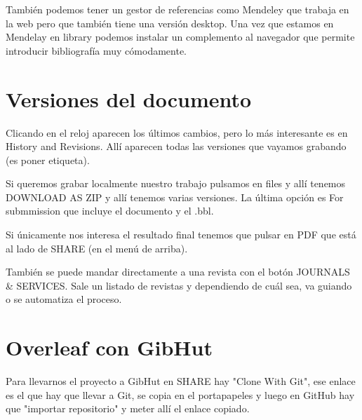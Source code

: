 \documentclass[a4paper]{article}
\begin{document}
También podemos tener un gestor de referencias como Mendeley que trabaja en la web pero que también tiene una versión desktop. Una vez que estamos en Mendelay en library podemos instalar un complemento al navegador que permite introducir bibliografía muy cómodamente.

\section{Versiones del documento}

Clicando en el reloj aparecen los últimos cambios, pero lo más interesante es en History and Revisions. Allí aparecen todas las versiones que vayamos grabando (es poner etiqueta). 

Si queremos grabar localmente nuestro trabajo pulsamos en files y allí tenemos DOWNLOAD AS ZIP y allí tenemos varias versiones. La última opción es For submmission que incluye el documento y el .bbl.

Si únicamente nos interesa el resultado final tenemos que pulsar en PDF que está al lado de SHARE (en el menú de arriba).

También se puede mandar directamente a una revista con el botón JOURNALS & SERVICES. Sale un listado de revistas y dependiendo de cuál sea, va guiando o se automatiza el proceso.

\section{Overleaf con GibHut}

Para llevarnos el proyecto a GibHut en SHARE hay "Clone With Git", ese enlace es el que hay que llevar a Git, se copia en el portapapeles y luego en GitHub hay que "importar repositorio" y meter allí el enlace copiado.



\end{document}
